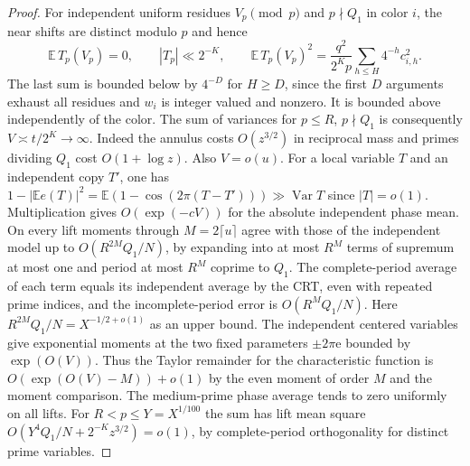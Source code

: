\documentclass[11pt,letterpaper]{article}
\begin{document}
\begin{proof}
For independent uniform residues $V_p\pmod p$ and $p\nmid Q_1$ in color
$i$, the near shifts are distinct modulo $p$ and hence
\[
 \mathbb E\,T_p(V_p)=0,\qquad |T_p|\ll 2^{-K},\qquad
 \mathbb E\,T_p(V_p)^2=\frac{q^2}{2^Kp}\sum_{h\le H}4^{-h}c_{i,h}^2.
\]
The last sum is bounded below by $4^{-D}$ for $H\ge D$, since the
first $D$ arguments exhaust all residues and $w_i$ is integer valued
and nonzero. It is bounded above independently of the color. The sum
of variances for $p\le R$, $p\nmid Q_1$ is consequently
$V\asymp t/2^K\to\infty$. Indeed the annulus costs $O(z^{3/2})$ in
reciprocal mass and primes dividing $Q_1$ cost $O(1+\log z)$. Also
$V=o(u)$. For a local variable $T$ and an independent copy $T'$, one has
$1-|\mathbb E e(T)|^2=\mathbb E(1-\cos(2\pi(T-T')))\gg\operatorname{Var} T$
since $|T|=o(1)$. Multiplication gives $O(\exp(-cV))$ for the
absolute independent phase mean. On every lift moments through
$M=2\lceil u\rceil$ agree with those of the independent model up to
$O(R^{2M}Q_1/N)$, by expanding into at most $R^M$ terms of supremum at most one
and period at most $R^M$ coprime to $Q_1$. The complete-period average
of each term equals its independent average by the CRT, even with
repeated prime indices, and the incomplete-period error is $O(R^MQ_1/N)$.
Here $R^{2M}Q_1/N=X^{-1/2+o(1)}$ as an upper bound. The independent centered variables give exponential moments
at the two fixed parameters $\pm2\pi\mathrm e$ bounded by $\exp(O(V))$.
Thus the Taylor remainder for the characteristic function is
$O(\exp(O(V)-M))+o(1)$ by the even moment of order $M$ and the moment
comparison. The medium-prime phase average tends to zero uniformly on
all lifts. For $R<p\le Y=X^{1/100}$ the sum has lift mean square
$O(Y^4Q_1/N+2^{-K}z^{3/2})=o(1)$, by complete-period orthogonality
for distinct prime variables.


\end{proof}
\end{document}
